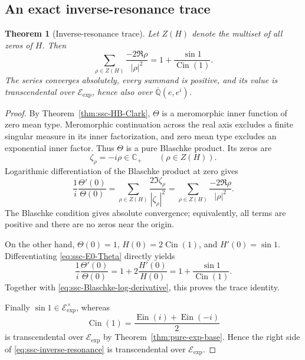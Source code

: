 \documentclass[11pt]{article}
\newtheorem{theorem}{Theorem}[section]
\theoremstyle{definition}
\theoremstyle{remark}
\newcommand{\Qbar}{\overline{\mathbb Q}}
\newcommand{\Ein}{\operatorname{Ein}}
\newcommand{\Cin}{\operatorname{Cin}}
\newcommand{\Eexp}{\mathcal E_{\mathrm{exp}}}
\begin{document}
\subsection{An exact inverse-resonance trace}

\begin{theorem}[Inverse-resonance trace]
\label{thm:ssc-inverse-resonance}
Let \(Z(H)\) denote the multiset of all zeros of \(H\).  Then
\begin{equation}\label{eq:ssc-inverse-resonance}
 \boxed{
 \sum_{\rho\in Z(H)}\frac{-2\Re\rho}{|\rho|^2}
 =1+\frac{\sin1}{\Cin(1)}.}
\end{equation}
The series converges absolutely, every summand is positive, and its value
is transcendental over \(\Eexp\), hence also over
\(\Qbar(e,e^i)\).
\end{theorem}

\begin{proof}
By Theorem~\ref{thm:ssc-HB-Clark}, \(\Theta\) is a meromorphic inner
function of zero mean type.  Meromorphic continuation across the real axis
excludes a finite singular measure in its inner factorization, and zero
mean type excludes an exponential inner factor.  Thus \(\Theta\) is a
pure Blaschke product.  Its zeros are
\[
 \zeta_\rho=-i\rho\in\mathbb C_+
 \qquad(\rho\in Z(H)).
\]
Logarithmic differentiation of the Blaschke product at zero gives
\begin{equation}\label{eq:ssc-Blaschke-log-derivative}
 \frac1i\frac{\Theta'(0)}{\Theta(0)}
 =\sum_{\rho\in Z(H)}
   \frac{2\Im\zeta_\rho}{|\zeta_\rho|^2}
 =\sum_{\rho\in Z(H)}
   \frac{-2\Re\rho}{|\rho|^2}.
\end{equation}
The Blaschke condition gives absolute convergence; equivalently, all terms
are positive and there are no zeros near the origin.

On the other hand, \(\Theta(0)=1\),
\(H(0)=2\Cin(1)\), and \(H'(0)=\sin1\).  Differentiating
\eqref{eq:ssc-E0-Theta} directly yields
\begin{equation}\label{eq:ssc-origin-phase-derivative}
 \frac1i\frac{\Theta'(0)}{\Theta(0)}
 =1+2\frac{H'(0)}{H(0)}
 =1+\frac{\sin1}{\Cin(1)}.
\end{equation}
Together with \eqref{eq:ssc-Blaschke-log-derivative}, this proves the
trace identity.

Finally \(\sin1\in\Eexp^\times\), whereas
\[
 \Cin(1)=\frac{\Ein(i)+\Ein(-i)}2
\]
is transcendental over \(\Eexp\) by
Theorem~\ref{thm:pure-exp-base}.  Hence the right side of
\eqref{eq:ssc-inverse-resonance} is transcendental over \(\Eexp\).
\end{proof}
\end{document}
